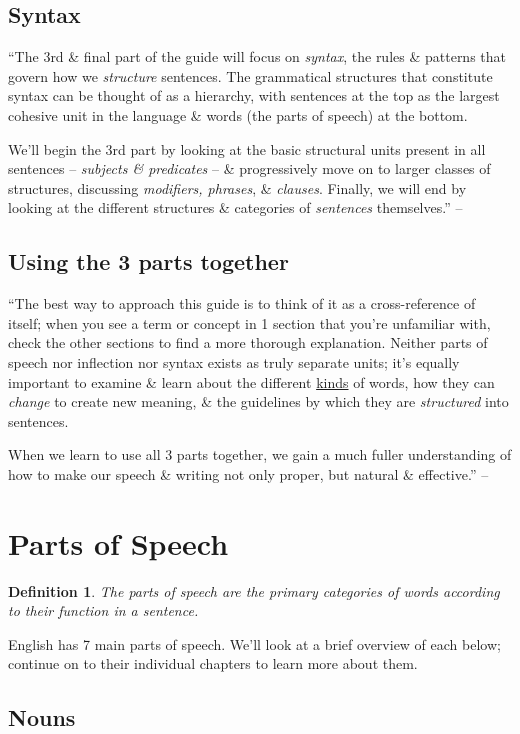 \documentclass{article}
\numberwithin{equation}{section}
\newtheorem{definition}{Definition}[section]
\begin{document}
\subsection{Syntax}
``The 3rd \& final part of the guide will focus on \textit{syntax}, the rules \& patterns that govern how we \textit{structure} sentences. The grammatical structures that constitute syntax can be thought of as a hierarchy, with sentences at the top as the largest cohesive unit in the language \& words (the parts of speech) at the bottom.

We'll begin the 3rd part by looking at the basic structural units present in all sentences -- \textit{subjects \& predicates} -- \& progressively move on to larger classes of structures, discussing \textit{modifiers, phrases}, \& \textit{clauses}. Finally, we will end by looking at the different structures \& categories of \textit{sentences} themselves.'' -- \cite[pp. 11--12]{Herring2016}

\subsection{Using the 3 parts together}
``The best way to approach this guide is to think of it as a cross-reference of itself; when you see a term or concept in 1 section that you're unfamiliar with, check the other sections to find a more thorough explanation. Neither parts of speech nor inflection nor syntax exists as truly separate units; it's equally important to examine \& learn about the different \underline{kinds} of words, how they can \textit{change} to create new meaning, \& the guidelines by which they are \textit{structured} into sentences.

When we learn to use all 3 parts together, we gain a much fuller understanding of how to make our speech \& writing not only proper, but natural \& effective.'' -- \cite[p. 12]{Herring2016}

\section{Parts of Speech}

\begin{definition}
	The {\rm parts of speech} are the primary categories of words according to their function in a sentence.
\end{definition}
English has 7 main parts of speech. We'll look at a brief overview of each below; continue on to their individual chapters to learn more about them.

\subsection{Nouns}


\printbibliography[heading=bibintoc]
	
\end{document}
